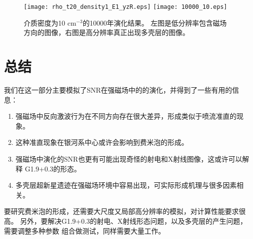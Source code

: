 \begin{figure*}
    \centering
    \texttt{[image: rho\_t20\_density1\_E1\_yzR.eps]}
    \texttt{[image: 10000\_10.eps]}
    \caption{介质密度为10 cm$^{-3}$的10000年演化结果。
    左图是低分辨率包含磁场方向的图像，右图是高分辨率真正出现多壳层的图像。}
\label{fig:shells}
\end{figure*}

\section{总结}
\label{MagSum}

我们在这一部分主要模拟了SNR在强磁场中的的演化，并得到了一些有用的信息：

\begin{enumerate}

    \item 强磁场中反向激波行为在不同方向存在很大差异，形成类似于喷流准直的现象。

    \item 这种准直现象在银河系中心或许会影响到费米泡的形成。

    \item 强磁场中演化的SNR也更有可能出现奇怪的射电和X射线图像，这或许可以解释
    G1.9+0.3的形态。

    \item 多壳层超新星遗迹在强磁场环境中容易出现，可实际形成机理与很多因素相关。

\end{enumerate}

要研究费米泡的形成，还需要大尺度又局部高分辨率的模拟，对计算性能要求很高。
另外，要解决G1.9+0.3的射电、X射线形态问题，以及多壳层的产生问题，需要调整多种参数
组合做测试，同样需要大量工作。
